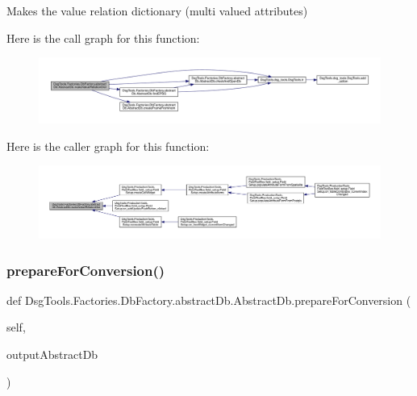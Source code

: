 \begin{DoxyVerb}Makes the value relation dictionary (multi valued attributes)
\end{DoxyVerb}
 Here is the call graph for this function\+:
\nopagebreak
\begin{figure}[H]
\begin{center}
\leavevmode
\includegraphics[width=350pt]{class_dsg_tools_1_1_factories_1_1_db_factory_1_1abstract_db_1_1_abstract_db_aaa59942db1d440d487cb90893e12f921_cgraph}
\end{center}
\end{figure}
Here is the caller graph for this function\+:
\nopagebreak
\begin{figure}[H]
\begin{center}
\leavevmode
\includegraphics[width=350pt]{class_dsg_tools_1_1_factories_1_1_db_factory_1_1abstract_db_1_1_abstract_db_aaa59942db1d440d487cb90893e12f921_icgraph}
\end{center}
\end{figure}
\mbox{\label{class_dsg_tools_1_1_factories_1_1_db_factory_1_1abstract_db_1_1_abstract_db_aed5b42455a633ecafc823b7f8591cce7}} 
\subsubsection{\texorpdfstring{prepare\+For\+Conversion()}{prepareForConversion()}}
{\footnotesize\ttfamily def Dsg\+Tools.\+Factories.\+Db\+Factory.\+abstract\+Db.\+Abstract\+Db.\+prepare\+For\+Conversion (\begin{DoxyParamCaption}\item[{}]{self,  }\item[{}]{output\+Abstract\+Db }\end{DoxyParamCaption})}

